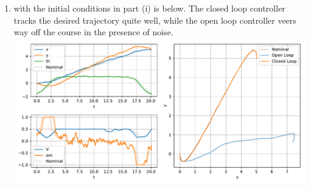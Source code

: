 \documentclass{article}
\begin{document}
\begin{enumerate}[label=(\roman*)]
\item {} with the initial conditions in part (i) is below. The closed loop controller tracks the desired trajectory quite well, while the open loop controller veers way off the course in the presence of noise. \\ \includegraphics[scale=0.6]{plots/sim_traj_closedloop.pdf}
\end{enumerate}

\newpage
\end{document}
